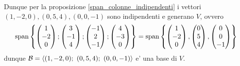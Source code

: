 \begin{example}
    Dunque per la proposizione \ref{span_colonne_indipendenti} i vettori $(1, -2, 0), (0, 5, 4), (0, 0, -1)$ sono indipendenti e generano $V$, ovvero \[
        \operatorname{span}\left\{\begin{pmatrix}
            1 \\ -2 \\ 0
        \end{pmatrix}; \begin{pmatrix}
            3 \\ -1 \\ 4
        \end{pmatrix}; \begin{pmatrix}
            -1 \\ 2 \\ -1
        \end{pmatrix}; \begin{pmatrix}
            4 \\ -3 \\ 0
        \end{pmatrix}\right\} = \operatorname{span}\left\{\begin{pmatrix} 1 \\ -2 \\ 0 \end{pmatrix}, \begin{pmatrix} 0 \\ 5 \\ 4 \end{pmatrix}, \begin{pmatrix} 0 \\ 0 \\ -1 \end{pmatrix}\right\}    
    \]
    dunque $\mathcal{B} = \left\langle (1, -2, 0);\ (0, 5, 4);\ (0, 0, -1) \right\rangle$ e' una base di $V$.
\end{example}

